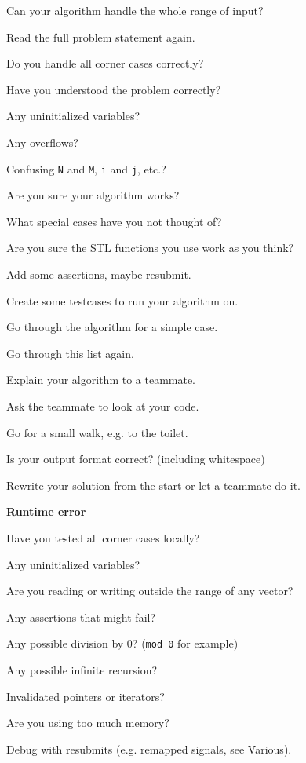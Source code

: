 \documentclass[a4paper]{article}
\begin{document}
\noindent
Can your algorithm handle the whole range of input?

\noindent
Read the full problem statement again.

\noindent
Do you handle all corner cases correctly?

\noindent
Have you understood the problem correctly?

\noindent
Any uninitialized variables?

\noindent
Any overflows?

\noindent
Confusing \texttt{N} and \texttt{M}, \texttt{i} and \texttt{j}, etc.?

\noindent
Are you sure your algorithm works?

\noindent
What special cases have you not thought of?

\noindent
Are you sure the STL functions you use work as you think?

\noindent
Add some assertions, maybe resubmit.

\noindent
Create some testcases to run your algorithm on.

\noindent
Go through the algorithm for a simple case.

\noindent
Go through this list again.

\noindent
Explain your algorithm to a teammate.

\noindent
Ask the teammate to look at your code.

\noindent
Go for a small walk, e.g. to the toilet.

\noindent
Is your output format correct? (including whitespace)

\noindent
Rewrite your solution from the start or let a teammate do it.

\noindent
\textbf{Runtime error}

\noindent
Have you tested all corner cases locally?

\noindent
Any uninitialized variables?

\noindent
Are you reading or writing outside the range of any vector?

\noindent
Any assertions that might fail?

\noindent
Any possible division by 0? (\texttt{mod 0} for example)

\noindent
Any possible infinite recursion?

\noindent
Invalidated pointers or iterators?

\noindent
Are you using too much memory?

\noindent
Debug with resubmits (e.g. remapped signals, see Various).
\end{document}

